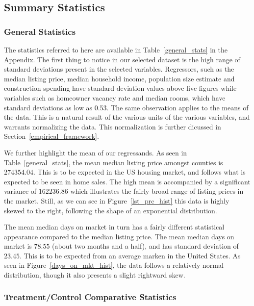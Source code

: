 \subsection{Summary Statistics}\label{subsection_summary_statistics}

\subsubsection{General Statistics}

The statistics referred to here are available in Table~\ref{general_stats} in the Appendix. The first thing to notice in our selected dataset is the high range of standard deviations present in the selected variables. Regressors, such as the median listing price, median household income, population size estimate and construction spending have standard deviation values above five figures while variables such as homeowner vacancy rate and median rooms, which have standard deviations as low as 0.53. The same observation applies to the means of the data. This is a natural result of the various units of the various variables, and warrants normalizing the data. This normalization is further dicussed in Section~\ref{empirical_framework}.

We further highlight the mean of our regressands. As seen in Table~\ref{general_stats}, the mean median listing price amongst counties is $274354.04$. This is to be expected in the US housing market, and follows what is expected to be seen in home sales. The high mean is accompanied by a significant variance of $162236.86$ which illustrates the fairly broad range of listing prices in the market. Still, as we can see in Figure~\ref{lst_prc_hist} this data is highly skewed to the right, following the shape of an exponential distribution.

The mean median days on market in turn has a fairly different statistical appearance compared to the median listing price. The mean median days on market is $78.55$ (about two months and a half), and has standard deviation of $23.45$. This is to be expected from an average marken in the United States. As seen in Figure~\ref{days_on_mkt_hist}, the data follows a relatively normal distribution, though it also presents a slight rightward skew.


\subsubsection{Treatment/Control Comparative Statistics}

